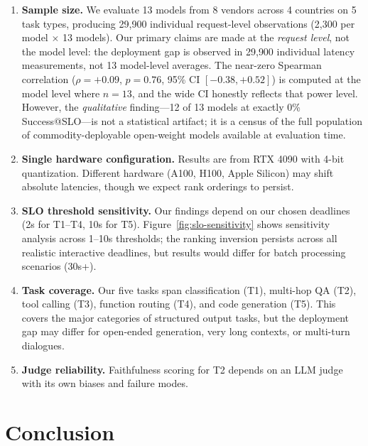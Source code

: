 \documentclass[11pt]{article}
\begin{document}
\begin{enumerate}[leftmargin=12pt]
    \item \textbf{Sample size.} We evaluate 13 models from 8 vendors across 4 countries on 5 task types, producing 29{,}900 individual request-level observations (2{,}300 per model $\times$ 13 models). Our primary claims are made at the \emph{request level}, not the model level: the deployment gap is observed in 29{,}900 individual latency measurements, not 13 model-level averages. The near-zero Spearman correlation ($\rho = +0.09$, $p = 0.76$, 95\% CI $[-0.38, +0.52]$) is computed at the model level where $n = 13$, and the wide CI honestly reflects that power level. However, the \emph{qualitative} finding---12 of 13 models at exactly 0\% Success@SLO---is not a statistical artifact; it is a census of the full population of commodity-deployable open-weight models available at evaluation time.

    \item \textbf{Single hardware configuration.} Results are from RTX 4090 with 4-bit quantization. Different hardware (A100, H100, Apple Silicon) may shift absolute latencies, though we expect rank orderings to persist.

    \item \textbf{SLO threshold sensitivity.} Our findings depend on our chosen deadlines (2s for T1--T4, 10s for T5). Figure~\ref{fig:slo-sensitivity} shows sensitivity analysis across 1--10s thresholds; the ranking inversion persists across all realistic interactive deadlines, but results would differ for batch processing scenarios (30s+).

    \item \textbf{Task coverage.} Our five tasks span classification (T1), multi-hop QA (T2), tool calling (T3), function routing (T4), and code generation (T5). This covers the major categories of structured output tasks, but the deployment gap may differ for open-ended generation, very long contexts, or multi-turn dialogues.

    \item \textbf{Judge reliability.} Faithfulness scoring for T2 depends on an LLM judge with its own biases and failure modes.
\end{enumerate}


\section{Conclusion}
\label{sec:conclusion}
\end{document}
